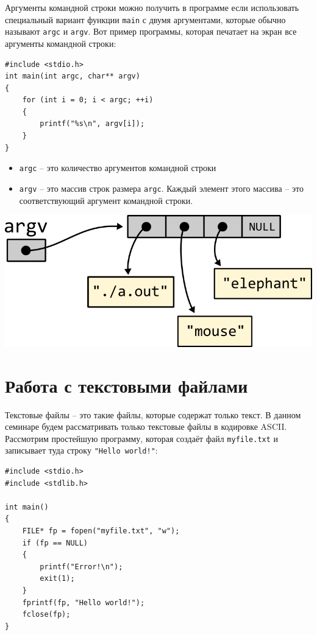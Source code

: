 \documentclass{article}
\begin{document}
Аргументы командной строки можно получить в программе если использовать специальный вариант функции \texttt{main} с двумя аргументами, которые обычно называют \texttt{argc} и \texttt{argv}. Вот пример программы, которая печатает на экран все аргументы командной строки:

\begin{lstlisting}
#include <stdio.h>
int main(int argc, char** argv) 
{
    for (int i = 0; i < argc; ++i)
    {
        printf("%s\n", argv[i]);
    }
}
\end{lstlisting}

\begin{itemize}
\item \texttt{argc} -- это количество аргументов командной строки
\item \texttt{argv} -- это массив строк размера \texttt{argc}. Каждый элемент этого массива -- это соответствующий
аргумент командной строки. 
\end{itemize}
\begin{center}
\includegraphics[scale=1]{../images/argv.png}
\end{center}

\newpage

\section*{Работа с текстовыми файлами}
Текстовые файлы -- это такие файлы, которые содержат только текст.
В данном семинаре будем рассматривать только текстовые файлы в кодировке ASCII.
Рассмотрим простейшую программу, которая создаёт файл \texttt{myfile.txt} и записывает туда строку \texttt{"Hello world!"}:
\begin{lstlisting}
#include <stdio.h>
#include <stdlib.h>

int main() 
{
    FILE* fp = fopen("myfile.txt", "w");
    if (fp == NULL) 
    {
        printf("Error!\n");
        exit(1);
    }
    fprintf(fp, "Hello world!");
    fclose(fp);
}
\end{lstlisting}
\end{document}
